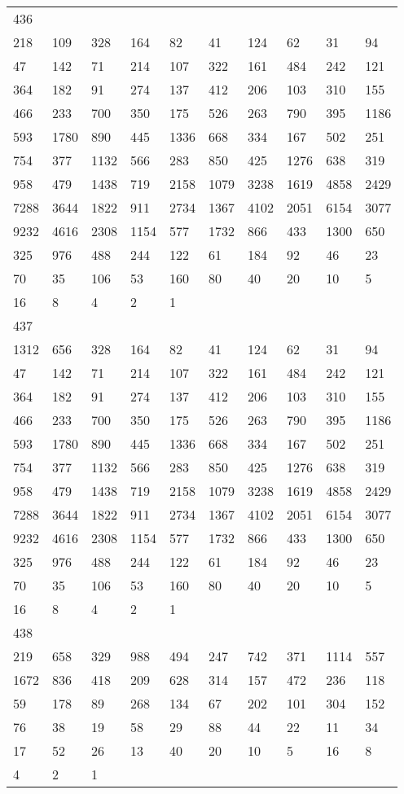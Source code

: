 \begin{longtable}{*{10}{l}}
436&&&&&&&&&\\
218& 109& 328& 164& 82& 41& 124& 62& 31& 94\\
47& 142& 71& 214& 107& 322& 161& 484& 242& 121\\
364& 182& 91& 274& 137& 412& 206& 103& 310& 155\\
466& 233& 700& 350& 175& 526& 263& 790& 395& 1186\\
593& 1780& 890& 445& 1336& 668& 334& 167& 502& 251\\
754& 377& 1132& 566& 283& 850& 425& 1276& 638& 319\\
958& 479& 1438& 719& 2158& 1079& 3238& 1619& 4858& 2429\\
7288& 3644& 1822& 911& 2734& 1367& 4102& 2051& 6154& 3077\\
9232& 4616& 2308& 1154& 577& 1732& 866& 433& 1300& 650\\
325& 976& 488& 244& 122& 61& 184& 92& 46& 23\\
70& 35& 106& 53& 160& 80& 40& 20& 10& 5\\
16& 8& 4& 2& 1& \\

437&&&&&&&&&\\
1312& 656& 328& 164& 82& 41& 124& 62& 31& 94\\
47& 142& 71& 214& 107& 322& 161& 484& 242& 121\\
364& 182& 91& 274& 137& 412& 206& 103& 310& 155\\
466& 233& 700& 350& 175& 526& 263& 790& 395& 1186\\
593& 1780& 890& 445& 1336& 668& 334& 167& 502& 251\\
754& 377& 1132& 566& 283& 850& 425& 1276& 638& 319\\
958& 479& 1438& 719& 2158& 1079& 3238& 1619& 4858& 2429\\
7288& 3644& 1822& 911& 2734& 1367& 4102& 2051& 6154& 3077\\
9232& 4616& 2308& 1154& 577& 1732& 866& 433& 1300& 650\\
325& 976& 488& 244& 122& 61& 184& 92& 46& 23\\
70& 35& 106& 53& 160& 80& 40& 20& 10& 5\\
16& 8& 4& 2& 1& \\

438&&&&&&&&&\\
219& 658& 329& 988& 494& 247& 742& 371& 1114& 557\\
1672& 836& 418& 209& 628& 314& 157& 472& 236& 118\\
59& 178& 89& 268& 134& 67& 202& 101& 304& 152\\
76& 38& 19& 58& 29& 88& 44& 22& 11& 34\\
17& 52& 26& 13& 40& 20& 10& 5& 16& 8\\
4& 2& 1& \\


\end{longtable}
